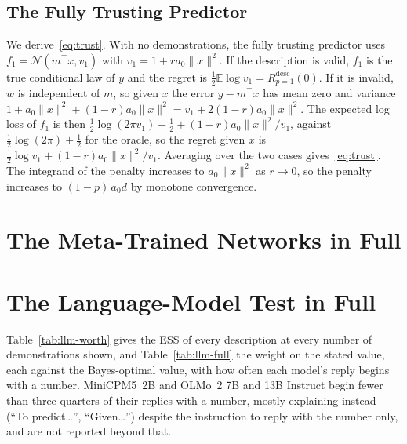 \documentclass{article}
\newcommand{\E}{\mathbb{E}}
\begin{document}
\subsection{The Fully Trusting Predictor}\label{app:trust}
We derive~\eqref{eq:trust}. With no demonstrations, the fully trusting predictor uses $f_1 = \mathcal{N}(m^\top x, v_1)$ with $v_1 = 1 + r a_0 \|x\|^2$. If the description is valid, $f_1$ is the true conditional law of $y$ and the regret is $\tfrac12 \E \log v_1 = R^{\mathrm{desc}}_{p=1}(0)$. If it is invalid, $w$ is independent of $m$, so given $x$ the error $y - m^\top x$ has mean zero and variance $1 + a_0\|x\|^2 + (1-r)a_0\|x\|^2 = v_1 + 2(1-r)a_0\|x\|^2$. The expected log loss of $f_1$ is then $\tfrac12 \log(2\pi v_1) + \tfrac12 + (1-r)a_0\|x\|^2/v_1$, against $\tfrac12 \log(2\pi) + \tfrac12$ for the oracle, so the regret given $x$ is $\tfrac12 \log v_1 + (1-r)a_0\|x\|^2/v_1$. Averaging over the two cases gives~\eqref{eq:trust}. The integrand of the penalty increases to $a_0\|x\|^2$ as $r \to 0$, so the penalty increases to $(1-p)\,a_0 d$ by monotone convergence.

\section{The Meta-Trained Networks in Full}\label{app:networks}
\begin{table}[t]
\centering\small
\caption{Networks against the reference predictors ($d=5$, $a_0=10$; 20{,}000 evaluation prompts per network, with the standard error of its ESS; the last three rows are the second seed). ``Trained'' and ``calibrated'' are the Bayes-optimal predictors with the training and the test reliability, computed once on 200{,}000 prompts (standard errors below $0.12$) and shown once where they coincide; ``single Gaussian'' is the best predictive that a mean and a variance can express, where the Bayes-optimal predictive is a mixture. ``Trust'' is the network's implied trust with the description alone, on a grid of step $0.05$ plus $0.99$ and $0.999$. The last two columns are the mean regret gap, network minus the trained predictor, over $n = 0, \dots, 20$, with and without a description.}
\label{tab:networks}
\vspace{3pt}

\end{table}

\section{The Language-Model Test in Full}\label{app:llm}
Table~\ref{tab:llm-worth} gives the ESS of every description at every number of demonstrations shown, and Table~\ref{tab:llm-full} the weight on the stated value, each against the Bayes-optimal value, with how often each model's reply begins with a number. MiniCPM5~2B and OLMo~2 7B and 13B Instruct begin fewer than three quarters of their replies with a number, mostly explaining instead (``To predict\ldots'', ``Given\ldots'') despite the instruction to reply with the number only, and are not reported beyond that.
\end{document}
